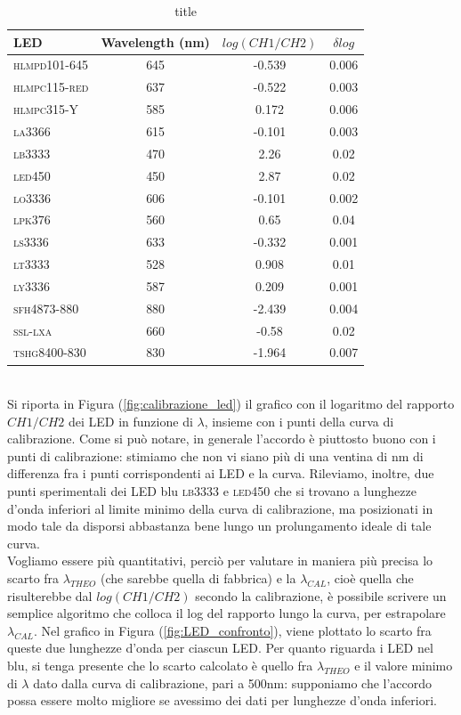 \documentclass[10pt,letterpaper]{article}
\begin{document}
\begin{table}[h]
\centering
\begin{tabular}{l|c|c|c}
\hline
\textbf{LED} & \textbf{Wavelength} (nm) & $log(CH1/CH2)$ & $\delta log$ \\
\hline
\textsc{hlmpd101-645} & 645 & -0.539 & 0.006 \\
\textsc{hlmpc115-red} & 637 & -0.522 & 0.003 \\
\textsc{hlmpc315-Y} & 585 & 0.172 & 0.006 \\
\textsc{la3366} & 615 & -0.101 & 0.003 \\
\textsc{lb3333} & 470 & 2.26 & 0.02 \\
\textsc{led450} & 450 & 2.87 & 0.02 \\
\textsc{lo3336} & 606 & -0.101 & 0.002 \\
\textsc{lpk376} & 560 & 0.65 & 0.04 \\
\textsc{ls3336} & 633 & -0.332 & 0.001 \\
\textsc{lt3333} & 528 & 0.908 & 0.01 \\
\textsc{ly3336} & 587 & 0.209 & 0.001 \\
\textsc{sfh4873-880} & 880 & -2.439 & 0.004 \\
\textsc{ssl-lxa} & 660 & -0.58 & 0.02 \\
\textsc{tshg8400-830} & 830 & -1.964 & 0.007 \\
\hline
\end{tabular}
\caption{title}
\label{tabella_LED}
\end{table}
~\\


Si riporta in Figura (\ref{fig:calibrazione_led}) il grafico con il logaritmo del rapporto $CH1/CH2$ dei LED in funzione di $\lambda$, insieme con i punti della curva di calibrazione. Come si può notare, in generale l'accordo è piuttosto buono con i punti di calibrazione: stimiamo che non vi siano più di una ventina di nm di differenza fra i punti corrispondenti ai LED e la curva. Rileviamo, inoltre, due punti sperimentali dei LED blu \textsc{lb3333} e \textsc{led450} che si trovano a lunghezze d'onda inferiori al limite minimo della curva di calibrazione, ma posizionati in modo tale da disporsi abbastanza bene lungo un prolungamento ideale di tale curva.\\



Vogliamo essere più quantitativi, perciò per valutare in maniera più precisa lo scarto fra $\lambda_{THEO}$ (che sarebbe quella di fabbrica) e la $\lambda_{CAL}$, cioè quella che risulterebbe dal $log(CH1/CH2)$ secondo la calibrazione, è possibile scrivere un semplice algoritmo che colloca il log del rapporto lungo la curva, per estrapolare $\lambda_{CAL}$. Nel grafico in Figura (\ref{fig:LED_confronto}), viene plottato lo scarto fra queste due lunghezze d'onda per ciascun LED. Per quanto riguarda i LED nel blu, si tenga presente che lo scarto calcolato è quello fra $\lambda_{THEO}$ e il valore minimo di $\lambda$ dato dalla curva di calibrazione, pari a 500nm: supponiamo che l'accordo possa essere molto migliore se avessimo dei dati per lunghezze d'onda inferiori.\\
\end{document}
